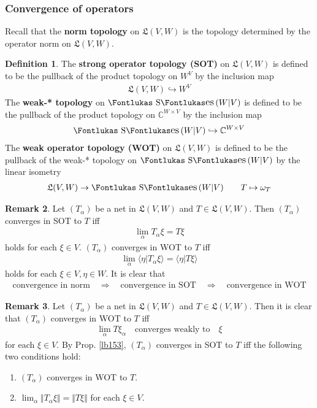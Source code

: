 \documentclass[12pt,b5paper,notitlepage]{article}
\theoremstyle{definition}
\newtheorem{df}{Definition}[subsection]
\newtheorem{rem}[df]{Remark}
\theoremstyle{plain}
\DeclareMathOperator{\Ses}{\text{\Fontlukas S}\text{\kern -0pt {\Fontlukas\large es}}\,}
\newcommand{\fk}{\mathfrak}
\newcommand{\bk}[1]{\langle {#1}\rangle}
\newcommand{\Cbb}{\mathbb C}
\numberwithin{equation}{section}
\begin{document}
\subsubsection{Convergence of operators}


Recall that the \textbf{norm topology} on $\fk L(V,W)$ is the topology determined by the operator norm on $\fk L(V,W)$.

\begin{df}
The \textbf{strong operator topology (SOT)}   on $\fk L(V,W)$ is defined to be the pullback of the product topology on $W^V$ by the inclusion map
\begin{align*}
\fk L(V,W)\hookrightarrow W^V
\end{align*}
The \textbf{weak-* topology} \index{00@Weak-* topology on $\Ses(W\vert V)$} on $\Ses(W|V)$ is defined to be the pullback of the product topology on $\Cbb^{W\times V}$ by the inclusion map
\begin{align*}
\Ses(W|V)\hookrightarrow \Cbb^{W\times V}
\end{align*}
The \textbf{weak operator topology (WOT)}   on $\fk L(V,W)$ is defined to be the pullback of the weak-* topology on $\Ses(W|V)$ by the linear isometry
\begin{align*}
\fk L(V,W)\rightarrow\Ses(W|V)\qquad T\mapsto \omega_T
\end{align*}
\end{df}


\begin{rem}
Let $(T_\alpha)$ be a net in $\fk L(V,W)$ and $T\in\fk L(V,W)$. Then $(T_\alpha)$ converges in SOT to $T$ iff
\begin{align}
\lim_\alpha T_\alpha\xi=T\xi
\end{align}
holds for each $\xi\in V$. $(T_\alpha)$ converges in WOT to $T$ iff
\begin{align}
\lim_\alpha \bk{\eta|T_\alpha\xi}=\bk{\eta|T\xi}
\end{align}
holds for each $\xi\in V,\eta\in W$. It is clear that
\begin{align*}
\text{convergence in norm}\quad\Rightarrow\quad\text{convergence in SOT}\quad\Rightarrow\quad\text{convergence in WOT}
\end{align*}
\end{rem}


\begin{rem}\label{lb241}
Let $(T_\alpha)$ be a net in $\fk L(V,W)$ and $T\in\fk L(V,W)$. Then it is clear that $(T_\alpha)$ converges in WOT to $T$ iff
\begin{align*}
\lim_\alpha T\xi_\alpha\quad\text{converges weakly to}\quad\xi
\end{align*}
for each $\xi\in V$. By Prop. \ref{lb153}, $(T_\alpha)$ converges in SOT to $T$ iff the following two conditions hold:
\begin{enumerate}[label=(\arabic*)]
\item $(T_\alpha)$ converges in WOT to $T$.
\item $\lim_\alpha \Vert T_\alpha\xi\Vert=\Vert T\xi\Vert$ for each $\xi\in V$.
\end{enumerate}
\end{rem}
\end{document}
